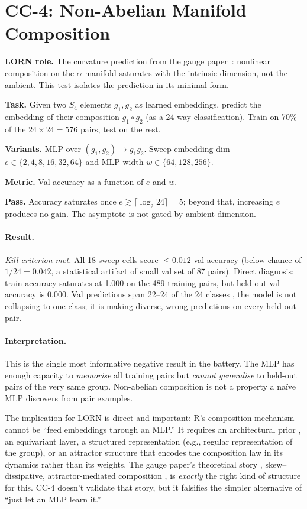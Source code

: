 \documentclass[10pt, twocolumn, a4paper]{article}
\begin{document}
\section{CC-4: Non-Abelian Manifold Composition}

\textbf{LORN role.} The curvature prediction from the gauge paper~\cite{gauge-v2}: nonlinear composition on the $\alpha$-manifold saturates with the intrinsic dimension, not the ambient. This test isolates the prediction in its minimal form.

\textbf{Task.} Given two $S_4$ elements $g_1, g_2$ as learned embeddings, predict the embedding of their composition $g_1 \circ g_2$ (as a 24-way classification). Train on 70\% of the $24 \times 24 = 576$ pairs, test on the rest.

\textbf{Variants.} MLP over $(g_1, g_2) \to g_1 g_2$. Sweep embedding dim $e \in \{2, 4, 8, 16, 32, 64\}$ and MLP width $w \in \{64, 128, 256\}$.

\textbf{Metric.} Val accuracy as a function of $e$ and $w$.

\textbf{Pass.} Accuracy saturates once $e \gtrsim \lceil \log_2 24 \rceil = 5$; beyond that, increasing $e$ produces no gain. The asymptote is not gated by ambient dimension.

\paragraph{Result.} \emph{Kill criterion met.} All 18 sweep cells score $\le 0.012$ val accuracy (below chance of $1/24 = 0.042$, a statistical artifact of small val set of 87 pairs). Direct diagnosis: train accuracy saturates at 1.000 on the 489 training pairs, but held-out val accuracy is 0.000. Val predictions span 22--24 of the 24 classes ,  the model is not collapsing to one class; it is making diverse, wrong predictions on every held-out pair.

\paragraph{Interpretation.} This is the single most informative negative result in the battery. The MLP has enough capacity to \emph{memorise} all training pairs but \emph{cannot generalise} to held-out pairs of the very same group. Non-abelian composition is not a property a na\"{i}ve MLP discovers from pair examples.

The implication for LORN is direct and important: R's composition mechanism cannot be ``feed embeddings through an MLP.'' It requires an architectural prior ,  an equivariant layer, a structured representation (e.g., regular representation of the group), or an attractor structure that encodes the composition law in its dynamics rather than its weights. The gauge paper's theoretical story ,  skew--dissipative, attractor-mediated composition ,  is \emph{exactly} the right kind of structure for this. CC-4 doesn't validate that story, but it falsifies the simpler alternative of ``just let an MLP learn it.''
\end{document}
